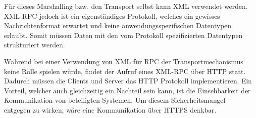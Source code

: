 Für dieses Marshalling bzw. den Transport selbst kann XML verwendet werden.
XML-RPC jedoch ist ein eigenständiges Protokoll, welches ein gewisses Nachrichtenformat erwartet und keine
anwendungsspezifischen Datentypen erlaubt.
Somit müssen Daten mit den vom Protokoll spezifizierten Datentypen strukturiert werden.

Während bei einer Verwendung von XML für RPC der Transportmechanismus keine Rolle spielen würde, findet
der Aufruf eines XML-RPC über HTTP statt.
Dadurch müssen die Clients und Server das HTTP Protokoll implementieren.
Ein Vorteil, welcher auch gleichzeitig ein Nachteil sein kann, ist die Einsehbarkeit der Kommunikation
von beteiligten Systemen.
Um diesem Sicherheitsmangel entgegen zu wirken, wäre eine Kommunikation über HTTPS denkbar.
